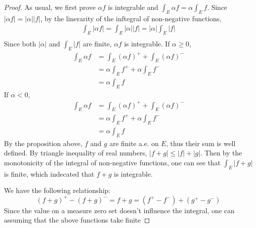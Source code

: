 \documentclass[lang=en, 12pt]{elegantbook}
\begin{document}
        \begin{proof}
            As usual, we first prove $\alpha f$ is integrable and $\int_E \alpha f = \alpha \int_E f$. Since $|\alpha f| = |\alpha| |f|$,
        by the linerarity of the inftegral of non-negative functions,
            \begin{equation*}
                \begin{aligned}
                    \int_E |\alpha f | = \int_E |\alpha| | f | = |\alpha| \int_E | f |\\ 
                \end{aligned}
            \end{equation*}
            Since both $ |\alpha|$ and $\int_E | f |$ are finite,  $\alpha f $ is integrable. If $\alpha \geq 0$,
            \begin{equation*}
                \begin{aligned}
                    \int_E \alpha f &= \int_E (\alpha f)^+ + \int_E (\alpha f)^- \\
                    &= \alpha \int_E f^+ +  \alpha \int_E f^-\\
                    &= \alpha \int_E f
                \end{aligned}
            \end{equation*}
            If $\alpha < 0$, 
            \begin{equation*}
                \begin{aligned}
                    \int_E \alpha f &= \int_E (\alpha f)^+ + \int_E (\alpha f)^- \\
                    &= \alpha \int_E f^+ +  \alpha \int_E f^-\\
                    &= \alpha \int_E f
                \end{aligned}
            \end{equation*}
            By the proposition above, $f$ and $g$ are finite a.e. on $E$, thus their sum is well defined. By triangle inequality of real 
        numbers, $|f+g| \leq |f|+|g|$. Then by the monotonicity of the integral of non-negative functions, one can see that $\int_E|f+g|$
        is finite, which indecated that $f+g$ is integrable. \par
            We have the following relationship:
            \begin{equation*}
                (f+g)^+ - (f+g)^- = f+g = (f^+ - f^-) + (g^+ -g^-)
            \end{equation*}
            Since the value on a measure zero set doesn't influence the integral, one can assuming that the above functions take finite 

\end{proof}
\end{document}
